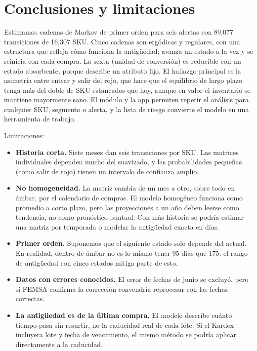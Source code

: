 \documentclass[11pt,letterpaper]{article}
\begin{document}
\section{Conclusiones y limitaciones}

Estimamos cadenas de Markov de primer orden para seis alertas con 89,077 transiciones de 16,307 SKU. Cinco cadenas son ergódicas y regulares, con una estructura que refleja cómo funciona la antigüedad: avanza un estado a la vez y se reinicia con cada compra. La sexta (unidad de conversión) es reducible con un estado absorbente, porque describe un atributo fijo. El hallazgo principal es la asimetría entre entrar y salir del rojo, que hace que el equilibrio de largo plazo tenga más del doble de SKU estancados que hoy, aunque en valor el inventario se mantiene mayormente sano. El módulo y la app permiten repetir el análisis para cualquier SKU, segmento o alerta, y la lista de riesgo convierte el modelo en una herramienta de trabajo.

Limitaciones:
\begin{itemize}
  \item \textbf{Historia corta.} Siete meses dan seis transiciones por SKU. Las matrices individuales dependen mucho del suavizado, y las probabilidades pequeñas (como salir de rojo) tienen un intervalo de confianza amplio.
  \item \textbf{No homogeneidad.} La matriz cambia de un mes a otro, sobre todo en ámbar, por el calendario de compras. El modelo homogéneo funciona como promedio a corto plazo, pero las proyecciones a un año deben leerse como tendencia, no como pronóstico puntual. Con más historia se podría estimar una matriz por temporada o modelar la antigüedad exacta en días.
  \item \textbf{Primer orden.} Suponemos que el siguiente estado solo depende del actual. En realidad, dentro de ámbar no es lo mismo tener 95 días que 175; el rango de antigüedad con cinco estados mitiga parte de esto.
  \item \textbf{Datos con errores conocidos.} El error de fechas de junio se excluyó, pero si FEMSA confirma la corrección convendría reprocesar con las fechas correctas.
  \item \textbf{La antigüedad es de la última compra.} El modelo describe cuánto tiempo pasa sin resurtir, no la caducidad real de cada lote. Si el Kardex incluyera lote y fecha de vencimiento, el mismo método se podría aplicar directamente a la caducidad.
\end{itemize}
\end{document}
